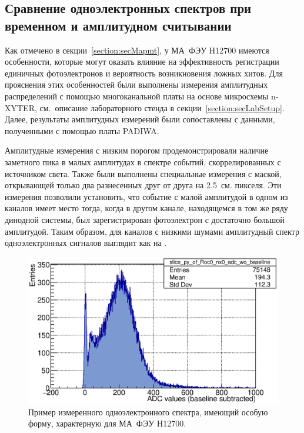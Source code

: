 \subsection{Сравнение одноэлектронных спектров при временном и амплитудном считывании}\label{section:secNxVsPadiwa}

Как отмечено в секции~\ref{section:secMapmt}, у МА~ФЭУ H12700 имеются особенности, которые могут оказать влияние на эффективность регистрации единичных фотоэлектронов и вероятность возникновения ложных хитов. Для прояснения этих особенностей были выполнены измерения амплитудных распределений с помощью многоканальной платы на основе микросхемы n-XYTER, см.~описание лабораторного стенда в секции~\ref{section:secLabSetup}. Далее, результаты амплитудных измерений были сопоставлены с данными, полученными с помощью платы PADIWA.

Амплитудные измерения с низким порогом продемонстрировали наличие заметного пика в малых амплитудах в спектре событий, скоррелированных с источником света. Также были выполнены специальные измерения с маской, открывающей только два разнесенных друг от друга на 2.5~см. пикселя. Эти измерения позволили установить, что событие с малой амплитудой в одном из каналов имеет место тогда, когда в другом канале, находящемся в том же ряду динодной системы, был зарегистрирован фотоэлектрон с достаточно большой амплитудой. Таким образом, для каналов с низкими шумами амплитудный спектр одноэлектронных сигналов выглядит как на .

\begin{figure}[H]
\includegraphics[width=1.0\textwidth]{pictures/30_PeculiarSpectrum.eps}
\caption{Пример измеренного одноэлектронного спектра, имеющий особую форму, характерную для МА~ФЭУ H12700.}
\label{fig:PeculiarSpectrum}
\end{figure}

